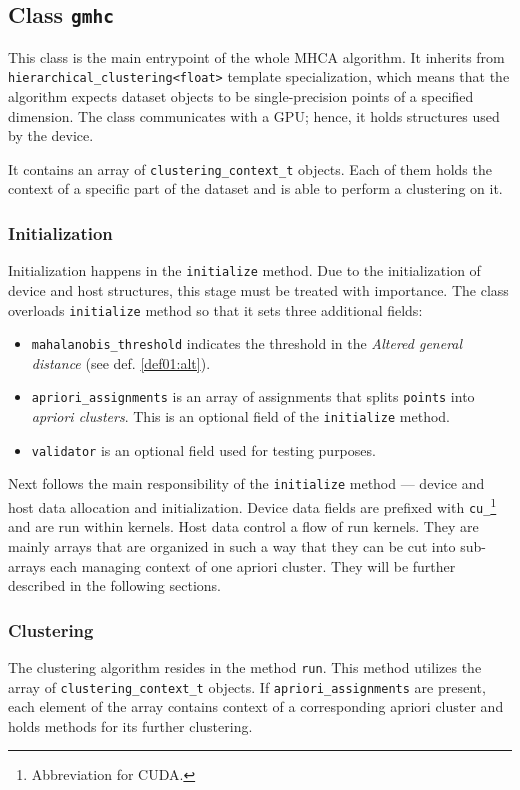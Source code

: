 \subsection{Class \texttt{gmhc}}

This class is the main entrypoint of the whole MHCA algorithm. It inherits from \texttt{hierarchical\_clustering<float>} template specialization, which means that the algorithm expects dataset objects to be single-precision points of a specified dimension. The class communicates
with a GPU; hence, it holds structures used by the device.

It contains an array of \texttt{clustering\_context\_t} objects. Each of them holds the context of a specific part of the dataset and is able to perform a clustering on it.

\subsubsection{Initialization}

Initialization happens in the \texttt{initialize} method. Due to the initialization of device and host structures, this stage must be treated with importance.
The class overloads \texttt{initialize} method so that it sets three additional fields:
\begin{itemize}
	\item \texttt{mahalanobis\_threshold} indicates the threshold in the \emph{Altered general distance} (see def. \ref{def01:alt}).
	
	\item\texttt{apriori\_assignments}  is an array of assignments that splits \texttt{points} into \emph{apriori clusters}. This is an optional field of the \texttt{initialize} method.
	
	\item \texttt{validator} is an optional field used for testing purposes.
\end{itemize}

Next follows the main responsibility of the \texttt{initialize} method --- device and host data allocation and initialization. Device data fields are prefixed with \texttt{cu\_}\footnote{Abbreviation for CUDA.} and are run within kernels. Host data control a flow of run kernels. They are mainly arrays that are organized in such a way that they can be cut into sub-arrays each managing context of one apriori cluster. They will be further described in the following sections.

\subsubsection{Clustering}
The clustering algorithm resides in the method \texttt{run}. This method utilizes the array of \texttt{clustering\_context\_t} objects. If \texttt{apriori\_assignments} are present, each element of the array contains context of a corresponding apriori cluster and holds methods for its further clustering. 

